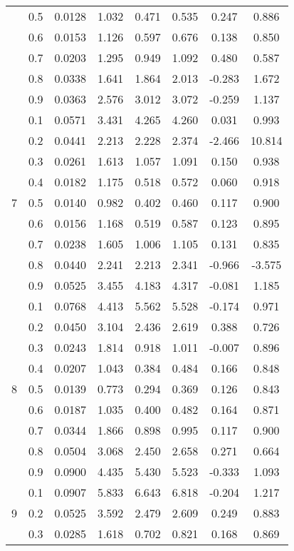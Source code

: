 \documentclass[11pt,a4paper]{report}
\begin{document}
\begin{longtable}{ | c | c || c | c | c | c | c | c | }
 & 0.5 & 0.0128 & 1.032 & 0.471 & 0.535 & 0.247 & 0.886 \\
 & 0.6 & 0.0153 & 1.126 & 0.597 & 0.676 & 0.138 & 0.850 \\
 & 0.7 & 0.0203 & 1.295 & 0.949 & 1.092 & 0.480 & 0.587 \\
 & 0.8 & 0.0338 & 1.641 & 1.864 & 2.013 & -0.283 & 1.672 \\
 & 0.9 & 0.0363 & 2.576 & 3.012 & 3.072 & -0.259 & 1.137 \\
 \hline
\multirow{9}{*}{7} & 0.1 & 0.0571 & 3.431 & 4.265 & 4.260 & 0.031 & 0.993 \\
 & 0.2 & 0.0441 & 2.213 & 2.228 & 2.374 & -2.466 & 10.814 \\
 & 0.3 & 0.0261 & 1.613 & 1.057 & 1.091 & 0.150 & 0.938 \\
 & 0.4 & 0.0182 & 1.175 & 0.518 & 0.572 & 0.060 & 0.918 \\
 & 0.5 & 0.0140 & 0.982 & 0.402 & 0.460 & 0.117 & 0.900 \\
 & 0.6 & 0.0156 & 1.168 & 0.519 & 0.587 & 0.123 & 0.895 \\
 & 0.7 & 0.0238 & 1.605 & 1.006 & 1.105 & 0.131 & 0.835 \\
 & 0.8 & 0.0440 & 2.241 & 2.213 & 2.341 & -0.966 & -3.575 \\
 & 0.9 & 0.0525 & 3.455 & 4.183 & 4.317 & -0.081 & 1.185 \\
 \hline
\multirow{9}{*}{8} & 0.1 & 0.0768 & 4.413 & 5.562 & 5.528 & -0.174 & 0.971 \\
 & 0.2 & 0.0450 & 3.104 & 2.436 & 2.619 & 0.388 & 0.726 \\
 & 0.3 & 0.0243 & 1.814 & 0.918 & 1.011 & -0.007 & 0.896 \\
 & 0.4 & 0.0207 & 1.043 & 0.384 & 0.484 & 0.166 & 0.848 \\
 & 0.5 & 0.0139 & 0.773 & 0.294 & 0.369 & 0.126 & 0.843 \\
 & 0.6 & 0.0187 & 1.035 & 0.400 & 0.482 & 0.164 & 0.871 \\
 & 0.7 & 0.0344 & 1.866 & 0.898 & 0.995 & 0.117 & 0.900 \\
 & 0.8 & 0.0504 & 3.068 & 2.450 & 2.658 & 0.271 & 0.664 \\
 & 0.9 & 0.0900 & 4.435 & 5.430 & 5.523 & -0.333 & 1.093 \\
 \hline
\multirow{9}{*}{9} & 0.1 & 0.0907 & 5.833 & 6.643 & 6.818 & -0.204 & 1.217 \\
 & 0.2 & 0.0525 & 3.592 & 2.479 & 2.609 & 0.249 & 0.883 \\
 & 0.3 & 0.0285 & 1.618 & 0.702 & 0.821 & 0.168 & 0.869 \\

\end{longtable}
\end{document}
